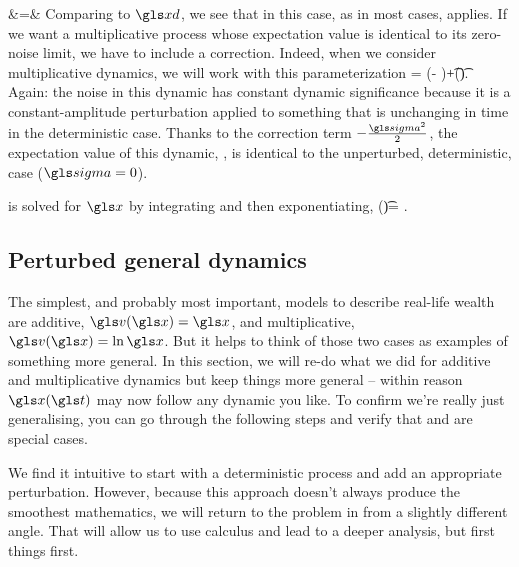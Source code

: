 &=&\exp{}
\eea
Comparing to $\xd$, we see that in this case, as in most cases,  applies. 
If we want a multiplicative process whose expectation value is identical to its zero-noise limit, 
we have to include a correction. Indeed, when we consider multiplicative dynamics, we will 
work with this parameterization
\be
\gd \ln \x= \left(\gmu- \right)\gd\t +\gsigma \gd \gW(\t).
\ee
Again: the noise in this dynamic has constant dynamic significance because it is a 
constant-amplitude perturbation applied to 
something that is unchanging in time in the deterministic case. Thanks to the correction 
term $-\frac{\gsigma^2}{2}$, the expectation value of this dynamic, , 
is identical to the unperturbed, deterministic, case ($\gsigma=0$).

 is solved for $\x$ by integrating and then exponentiating, 
\be
\x(\t)= \exp{}.
\ee


\subsection{Perturbed general dynamics}
The simplest, and probably most important, models to describe real-life wealth are additive, $\gv(\x)=\x$,
and multiplicative, $\gv(\x)=\ln\x$. But it helps to think of those two cases as examples of something more general. 
In this section, we will re-do what we did for additive and multiplicative dynamics but keep things more 
general -- within reason $\x(\t)$ may now follow any dynamic you like. To confirm we're really just generalising, 
you can go through the following steps and verify that  and 
 are special cases. 

We find it intuitive to start with a deterministic process and add an appropriate perturbation. However, because 
this approach doesn't always produce the smoothest mathematics, we will return to the problem in 
 from a slightly different angle. That will allow us to use \Ito calculus and lead to 
a deeper analysis, but first things first.

